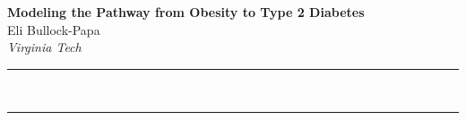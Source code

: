 \documentclass[a4paper,12pt]{article}
\renewenvironment{abstract}
 {\par\noindent\textbf{\abstractname}\ \ignorespaces \\}
 {\par\noindent\medskip}
\begin{document}
\pagestyle{fancy}
\thispagestyle{empty}
\fancyhead[L]{}
\renewcommand*{\thefootnote}{\fnsymbol{footnote}}
\begin{center}
\Large{\textbf{Modeling the Pathway from Obesity to Type 2 Diabetes}}
\vspace{0.4cm}
\normalsize
\\ Eli Bullock-Papa \\
\vspace{0.1cm}
\textit{Virginia Tech}
\medskip
\normalsize
\end{center}
{\color{gray}\hrule}
\vspace{0.4cm}
\begin{abstract}

\end{abstract}
{\color{gray}\hrule}
\medskip


\vspace{0.4cm}

\vspace{0.4cm}

\vspace{0.4cm}



\end{document}
